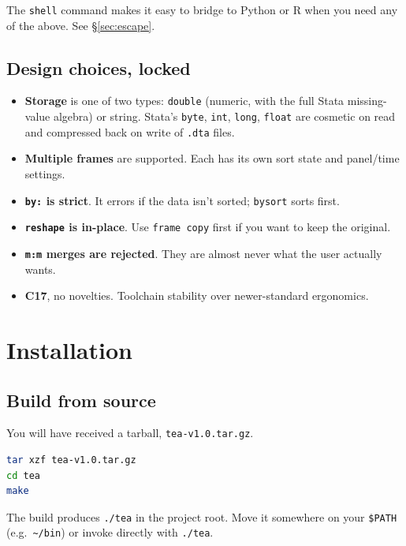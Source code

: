 \documentclass[11pt,letterpaper]{article}
\newcommand{\teaversion}{1.0}
\begin{document}
The \texttt{shell} command makes it easy to bridge to Python or R when
you need any of the above.  See \S\ref{sec:escape}.

\subsection{Design choices, locked}

\begin{itemize}
\item \textbf{Storage} is one of two types: \texttt{double} (numeric, with
the full Stata missing-value algebra) or string.  Stata's \texttt{byte},
\texttt{int}, \texttt{long}, \texttt{float} are cosmetic on read and
compressed back on write of \texttt{.dta} files.
\item \textbf{Multiple frames} are supported.  Each has its own sort
state and panel/time settings.
\item \textbf{\texttt{by:} is strict}.  It errors if the data isn't
sorted; \texttt{bysort} sorts first.
\item \textbf{\texttt{reshape} is in-place}.  Use \texttt{frame copy}
first if you want to keep the original.
\item \textbf{\texttt{m:m} merges are rejected}.  They are almost never
what the user actually wants.
\item \textbf{C17}, no novelties.  Toolchain stability over
newer-standard ergonomics.
\end{itemize}

\section{Installation}

\subsection{Build from source}

You will have received a tarball, \texttt{tea-v\teaversion.tar.gz}.

\begin{lstlisting}[language=bash]
tar xzf tea-v1.0.tar.gz
cd tea
make
\end{lstlisting}

The build produces \texttt{./tea} in the project root.  Move it
somewhere on your \texttt{\$PATH} (e.g.\ \texttt{\textasciitilde/bin})
or invoke directly with \texttt{./tea}.
\end{document}
